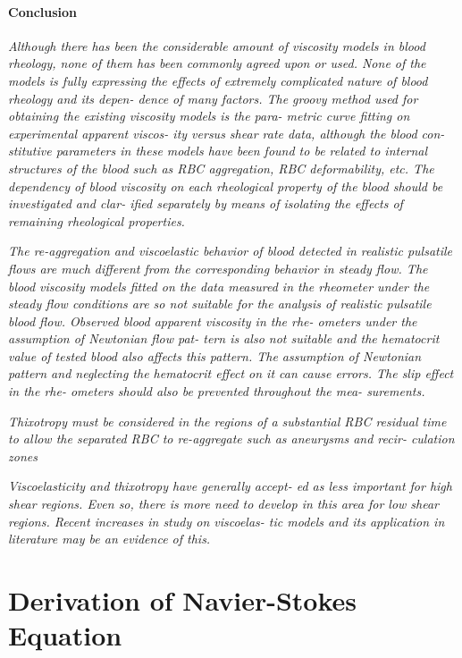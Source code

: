 \documentclass[11pt,letterpaper]{article}
\begin{document}
 \paragraph{Conclusion}
\textit{Although there has been  the considerable amount of viscosity models in blood  rheology, none of them  has been commonly agreed upon or used. None of the models is fully expressing the effects of extremely complicated nature of blood  rheology and  its  depen- dence of many factors. The groovy method used for obtaining the existing viscosity models is  the para- metric curve fitting on experimental apparent  viscos- ity versus shear rate  data,  although the  blood con- stitutive parameters in these models have been found to be  related to internal  structures of the blood such  as RBC aggregation, RBC deformability,  etc. The dependency of blood  viscosity on each rheological property of the  blood should  be investigated and  clar- ified separately  by  means of  isolating the effects of remaining rheological properties.}


\textit{The  re-aggregation and  viscoelastic behavior of  blood detected in  realistic pulsatile flows are  much  different from  the corresponding behavior  in steady  flow. The blood viscosity models fitted on the  data measured in the rheometer under the steady flow conditions are so not suitable for the  analysis of  realistic  pulsatile blood flow. Observed blood apparent  viscosity in  the rhe- ometers under the assumption of Newtonian flow pat- tern is also not suitable and the hematocrit value of tested blood also affects this pattern. The assumption of Newtonian pattern and  neglecting the  hematocrit effect on  it can cause  errors. The  slip effect  in  the rhe- ometers  should also be  prevented throughout  the mea- surements.}

\textit{Thixotropy must be  considered  in the regions  of  a substantial RBC residual  time  to allow the  separated RBC to  re-aggregate  such as aneurysms and  recir- culation zones}

\textit{Viscoelasticity  and thixotropy  have generally accept- ed  as  less important for high shear  regions. Even  so, there is more need  to develop in this area  for  low shear  regions. Recent  increases in  study on viscoelas- tic models  and its application in literature may be an evidence of this.}

\newpage
\section{Derivation of Navier-Stokes Equation}
\end{document}
